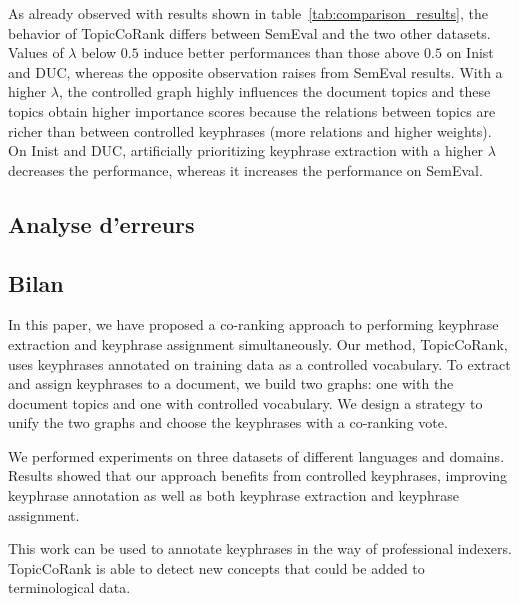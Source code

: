           As already observed with results shown in table~\ref{tab:comparison_results}, the
          behavior of TopicCoRank differs between SemEval and the two other datasets. Values
          of $\lambda$ below $0.5$ induce better performances than those above $0.5$ on Inist and
          DUC, whereas the opposite observation raises from SemEval results. With a higher
          $\lambda$, the controlled graph highly influences the document topics and these topics obtain
          higher importance scores because the relations between topics are richer than
          between controlled keyphrases (more relations and higher weights). On Inist and DUC,
          artificially prioritizing keyphrase extraction with a higher $\lambda$ decreases
          the performance, whereas it increases the performance on SemEval.

    \subsection{Analyse d'erreurs}
    \label{subsec:main-automatic_keyphrase_annotation-supervised_automatic_keyphrase_annotation-error_analysis}

    \subsection{Bilan}
    \label{subsec:main-automatic_keyphrase_annotation-supervised_automatic_keyphrase_annotation-conclusion}
      In this paper, we have proposed a co-ranking approach to performing keyphrase
      extraction and keyphrase assignment simultaneously. Our method,
      TopicCoRank, uses keyphrases annotated on training data as a controlled
      vocabulary. %
      To extract and assign keyphrases to a document, we build two graphs: one with the
      document topics and one with controlled vocabulary. We design a strategy to unify the two graphs and 
      choose the keyphrases with  a co-ranking vote.
      
      
      We performed experiments on three datasets of different languages and
      domains. Results showed that our approach benefits from controlled
      keyphrases, improving keyphrase annotation as well as both keyphrase extraction and keyphrase assignment.

      This work can be used to annotate keyphrases in the way of professional
      indexers. TopicCoRank is able to detect new concepts that could be added
      to terminological data.
      
